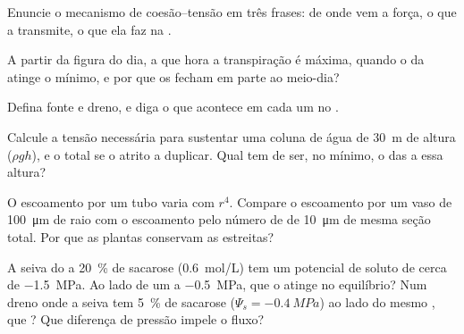\begin{exercise}[$\star$]\label{exo:b1:plant-transport:2}
Enuncie o mecanismo de coesão--tensão em três frases: de onde vem a
força, o que a transmite, o que ela faz na .
\end{exercise}

\begin{exercise}[$\star$]\label{exo:b1:plant-transport:3}
A partir da figura do dia, a que hora a transpiração é máxima, quando
o  da  atinge o mínimo, e por que os 
fecham em parte ao meio-dia?
\end{exercise}

\begin{exercise}[$\star$]\label{exo:b1:plant-transport:4}
Defina fonte e dreno, e diga o que acontece em cada um no .
\end{exercise}

\begin{exercise}[$\star\star$]\label{exo:b1:plant-transport:5}
Calcule a tensão necessária para sustentar uma coluna de água de
\qty{30}{m} de altura ($\rho g h$), e o total se o atrito a duplicar.
Qual tem de ser, no mínimo, o  das  a essa altura?
\end{exercise}

\begin{exercise}[$\star\star$]\label{exo:b1:plant-transport:6}
O escoamento por um tubo varia com $r^4$. Compare o escoamento por um
vaso de \qty{100}{\micro m} de raio com o escoamento pelo número de
 de \qty{10}{\micro m} de mesma seção total. Por que as
plantas conservam as estreitas?
\end{exercise}

\begin{exercise}[$\star\star$]\label{exo:b1:plant-transport:7}
A seiva do  a \qty{20}{\%} de sacarose (\qty{0.6}{mol/L}) tem um
potencial de soluto de cerca de \qty{-1.5}{MPa}. Ao lado de um 
a \qty{-0.5}{MPa}, que  o  atinge no
equilíbrio? Num dreno onde a seiva tem \qty{5}{\%} de sacarose
($\Psi_s = \qty{-0.4}{MPa}$) ao lado do mesmo , que
? Que diferença de pressão impele o fluxo?
\end{exercise}

